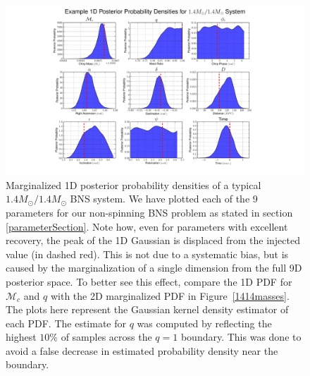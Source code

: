\documentclass[11pt,a4paper]{emulateapj} 
\begin{document}
\begin{figure}[t!]
\centering \includegraphics[trim=7cm 0cm 0cm 0cm,
  clip=true,scale=0.58]{9dpdf}
\caption{\label{9dPDF} Marginalized 1D  posterior probability densities
  of a typical $1.4M_{\odot}/1.4M_{\odot}$ BNS
  system.  We have plotted each of the 9 parameters for our
  non-spinning BNS problem as stated in section \ref{parameterSection}.
    Note how, even for parameters with excellent recovery, the peak of
  the 1D Gaussian is displaced from the injected value (in dashed
  red).  This is not due to a systematic bias, but is caused by the
  marginalization of a single dimension from the full 9D posterior
  space.  To better see this effect, compare the 1D PDF for
  $\mathcal{M}_{c}$ and $q$ with the 2D marginalized PDF in
  Figure~\ref{1414masses}.  The plots here represent the Gaussian kernel density
  estimator of each PDF.  The estimate for $q$ was 
  computed by reflecting the highest $10\%$ of samples across the $q=1$ boundary.  
  This was done to avoid a false decrease in estimated probability density near
  the boundary.}
\end{figure}
\end{document}
